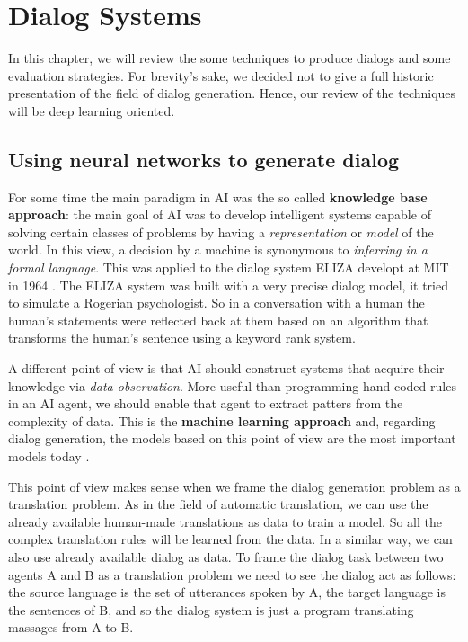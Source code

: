\chapter{Dialog Systems}
\label{ch:03-dialog-systems}

 In this chapter, we will review the some techniques to produce dialogs and some evaluation strategies. For brevity's sake, we decided not to give a full historic presentation of the field of dialog generation. Hence, our review of the techniques will be deep learning oriented.

\section{Using neural networks to generate dialog}
\label{ch:03-gen}

\par For some time the main paradigm in AI was the so called \textbf{knowledge base approach}: the main goal of AI was to develop intelligent systems capable of solving certain classes of problems by having a \textit{representation} or \textit{model} of the world. In this view, a decision by a machine is synonymous to \textit{inferring in a formal language}\cite{McCarthy}. This was applied to the dialog system ELIZA developt at MIT in 1964 \cite{Weizenbaum}. The ELIZA system was built with a very precise dialog model, it tried to simulate a Rogerian psychologist. So in a conversation with a human the human's statements were reflected back at them based on an algorithm that transforms the human's sentence using a keyword rank system.

\par A different point of view is that AI should construct systems that acquire their knowledge via \textit{data observation}. More useful than programming hand-coded rules in an AI agent, we should enable that agent to extract patters from the complexity of data. This is the \textbf{machine learning approach} and, regarding dialog generation, the models based on this point of view are the most important models today \cite{BordesW16, Lowe:2016, Serban:2016c, Serban:2016a, Shao:2017, Wen}.

This point of view makes sense when we frame the dialog generation problem as a translation problem. As in the field of automatic translation, we can use the already available human-made translations as data to train a model. So all the complex translation rules will be learned from the data. In a similar way, we can also use already available dialog as data. To frame the dialog task between two agents A and B as a translation problem we need to see the dialog act as follows: the source language is the set of utterances spoken by A, the target language is the sentences of B, and so the dialog system is just a program translating massages from A to B. 

